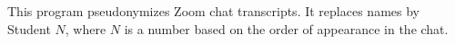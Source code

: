 This program pseudonymizes Zoom chat transcripts.
It replaces names by Student \(N\), where \(N\) is a number based on the order 
of appearance in the chat.
